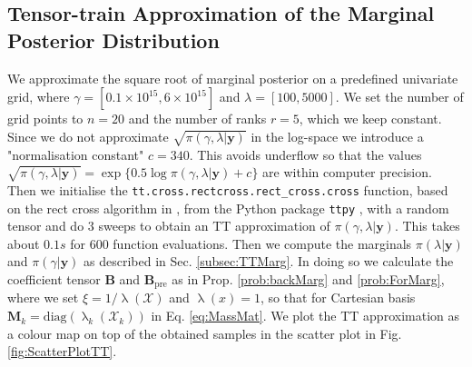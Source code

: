 \subsection{Tensor-train Approximation of the Marginal Posterior Distribution}
\label{subsec:firstMargTT}
We approximate the square root of marginal posterior on a predefined univariate grid, where $\gamma = [ 0.1 \times 10^{15}, 6 \times 10^{15}]$ and $\lambda = [ 100, 5000]$.
We set the number of grid points to $n = 20$ and the number of ranks $r = 5$, which we keep constant.
Since we do not approximate $\sqrt{ \pi(\gamma, \lambda| \bm{y}) }$ in the log-space we introduce a "normalisation constant" $c = 340$. This avoids underflow so that the values $\sqrt{\pi(\gamma, \lambda| \bm{y})} = \exp \{ 0.5 \log  \pi(\gamma, \lambda| \bm{y}) + c \} $ are within computer precision.
Then we initialise the \texttt{tt.cross.rectcross.rect\_cross.cross} function, based on the rect cross algorithm in \cite{OSELEDETS2010TTCross}, from the Python package \texttt{ttpy} \cite{Oseledets2018ttpy}, with a random tensor and do 3 sweeps to obtain an TT approximation of $\pi(\gamma, \lambda| \bm{y})$.
This takes about $0.1s$ for $600$ function evaluations.
Then we compute the marginals $\pi(\lambda| \bm{y})$ and $\pi(\gamma| \bm{y})$ as described in Sec. \ref{subsec:TTMarg}.
In doing so we calculate the coefficient tensor $\bm{B}$ and $\bm{B}_{\text{pre}}$ as in Prop. \ref{prob:backMarg} and \ref{prob:ForMarg}, where we set $\xi = 1 / \uplambda (\mathcal{X})$ and $\uplambda(x) = 1$, so that for Cartesian basis $\bm{M}_k = \text{diag}(\uplambda_k(\mathcal{X}_k))$ in Eq. \ref{eq:MassMat}.
We plot the TT approximation as a colour map on top of the obtained samples in the scatter plot in Fig. \ref{fig:ScatterPlotTT}.

